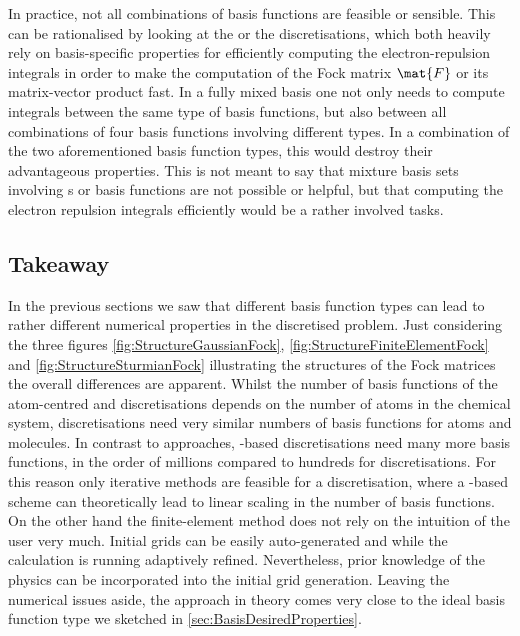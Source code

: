 In practice, not all combinations of basis functions are feasible or sensible.
This can be rationalised by looking at the {\cGTO} or the \CS discretisations,
which both heavily rely on basis-specific properties for efficiently
computing the electron-repulsion integrals
in order to make the computation of the Fock matrix $\mat{F}$
or its matrix-vector product fast.
In a fully mixed basis one not only needs to compute \ERI integrals
between the same type of basis functions,
but also between all combinations of four basis functions involving different types.
In a combination of the two aforementioned basis function types,
this would destroy their advantageous properties.
This is not meant to say that mixture basis sets involving
{\cGTO}s or {\CS} basis functions are not possible or helpful,
but that computing the electron repulsion integrals efficiently
would be a rather involved tasks.

\subsection{Takeaway}
\label{sec:BasisTakeaway}
In the previous sections we saw that different basis function types
can lead to rather different numerical properties in the discretised \HF problem.
Just considering the three figures
\vref{fig:StructureGaussianFock},
\vref{fig:StructureFiniteElementFock}
and \vref{fig:StructureSturmianFock}
illustrating the structures of the Fock matrices
the overall differences are apparent.
Whilst the number of basis functions of the atom-centred
\cGTO and \CS discretisations depends on the number of atoms
in the chemical system,
\FE discretisations need very similar numbers of basis functions
for atoms and molecules.
In contrast to \AO approaches, \FE-based discretisations
need many more basis functions, in the order of millions
compared to hundreds for \AO discretisations.
For this reason only iterative methods
are feasible for a \FE discretisation,
where a \contraction-based scheme can theoretically
lead to linear scaling in the number of basis functions.
On the other hand the finite-element method
does not rely on the intuition of the user very much.
Initial grids can be easily auto-generated and
while the calculation is running adaptively refined.
Nevertheless, prior knowledge of the physics can be incorporated
into the initial grid generation.
Leaving the numerical issues aside,
the \FE approach in theory comes very close to the ideal
basis function type we sketched in \vref{sec:BasisDesiredProperties}.

